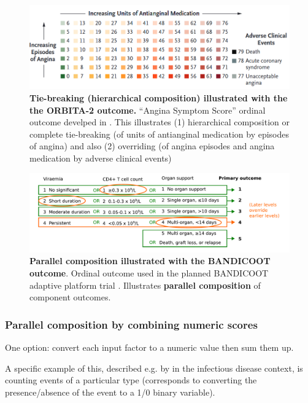 \documentclass[
  11pt,
  fleqn
]{article}
\begin{document}
\begin{figure}
  \includegraphics[width=6in]{rajkumar_et_al_outcome.png}
  \caption{\textbf{Tie-breaking (hierarchical composition)
      illustrated with the
    the ORBITA-2 outcome.} ``Angina
    Symptom Score'' ordinal outcome develped in
    \citep{rajkumarPlaceboControlledTrialPercutaneous2023}. This illustrates
    (1) hierarchical composition or complete tie-breaking (of units
      of antianginal medication by
    episodes of angina) and also (2) overriding (of angina episodes and
  angina medication by adverse clinical events)}
  \label{fig:rajkumar_et_al_outcome}
\end{figure}

\begin{figure}
  \includegraphics[width=7in]{parallel_composition_bandicoot.pdf}
  \caption{\textbf{Parallel composition illustrated with the
    BANDICOOT outcome}.
    Ordinal outcome used in the planned BANDICOOT adaptive platform trial
    \citep{walkerCodesigningNovelOrdinal2025}. Illustrates \textbf{parallel
  composition} of component outcomes.} \label{fig:parallel_bandicoot}
\end{figure}

\subsubsection{Parallel composition by combining numeric scores}

One option: convert each input factor to a numeric value then sum them up.

A specific example of this, described e.g. by
\citet{ongUnlockingDOORHow2023} in
the infectious disease context, is counting events of a particular
type (corresponds to converting the presence/absence of the event to
a 1/0 binary variable).
\end{document}
